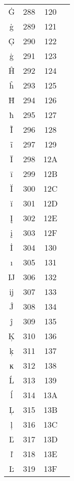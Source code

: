 \documentclass[10pt]{article}
\begin{document}
\begin{tabular}{crcl}
Ġ&288&120&\\
ġ&289&121&\\
Ģ&290&122&\\
ģ&291&123&\\
Ĥ&292&124&\\
ĥ&293&125&\\
Ħ&294&126&\\
ħ&295&127&\\
Ĩ&296&128&\\
ĩ&297&129&\\
Ī&298&12A&\\
ī&299&12B&\\
Ĭ&300&12C&\\
ĭ&301&12D&\\
Į&302&12E&\\
į&303&12F&\\
İ&304&130&\\
ı&305&131&\\
Ĳ&306&132&\\
ĳ&307&133&\\
Ĵ&308&134&\\
ĵ&309&135&\\
Ķ&310&136&\\
ķ&311&137&\\
ĸ&312&138&\\
Ĺ&313&139&\\
ĺ&314&13A&\\
Ļ&315&13B&\\
ļ&316&13C&\\
Ľ&317&13D&\\
ľ&318&13E&\\
Ŀ&319&13F&\\
\end{tabular}
\end{document}
